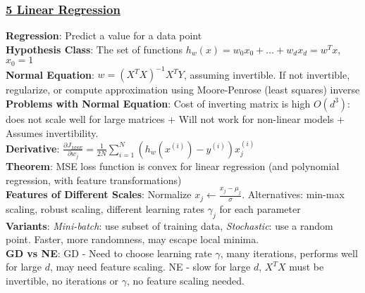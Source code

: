 \documentclass{article}
\begin{document}
{\begin{multicols*}{3}
\subsubsection*{\underline{5 Linear Regression}}
\textbf{Regression}: Predict a value for a data point\\
\textbf{Hypothesis Class}: The set of functions $h_w(x)=w_0x_0+\dots+w_dx_d=w^Tx$, $x_0=1$ \\ 
\textbf{Normal Equation}: $w=(X^TX)^{-1}X^TY$, assuming invertible. If not invertible, regularize, or compute approximation using Moore-Penrose (least squares) inverse \\
\textbf{Problems with Normal Equation}: Cost of inverting matrix is high $O(d^3)$: does not scale well for large matrices + Will not work for non-linear models + Assumes invertibility.\\
\textbf{Derivative}: $\frac{\partial J_{MSE}}{\partial w_j}=\frac{1}{2N}\sum_{i=1}^N(h_w(x^{(i)})-y^{(i)})x^{(i)}_j$ \\
\textbf{Theorem}: MSE loss function is convex for linear regression (and polynomial regression, with feature transformations)\\
\textbf{Features of Different Scales}: Normalize $x_j\leftarrow\frac{x_j-\mu_j}{\sigma}$. Alternatives: min-max scaling, robust scaling, different learning rates $\gamma_j$ for each parameter\\
\textbf{Variants}: \textit{Mini-batch}: use subset of training data, \textit{Stochastic}: use a random point. Faster, more randomness, may escape local minima. \\
\textbf{GD vs NE}: GD - Need to choose learning rate $\gamma$, many iterations, performs well for large $d$, may need feature scaling. NE - slow for large $d$, $X^TX$ must be invertible, no iterations or $\gamma$, no feature scaling needed.

\end{multicols*}}
\end{document}
